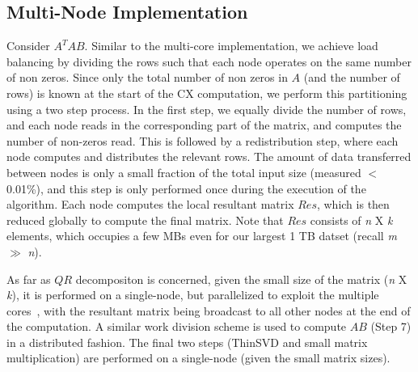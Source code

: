 \subsection {Multi-Node Implementation}
Consider $A^TAB$.
Similar to the multi-core implementation, we achieve load balancing by
dividing the rows %
such that each node operates on the same number of non zeros. 
Since only the total number of non zeros in $A$ (and the number of
rows) is known at the start
of the CX computation, we perform this partitioning using a two step
process. In the first step, we equally divide the number of rows, 
and each node reads in the corresponding
part of the matrix, and computes the number of non-zeros read. This is
followed by a redistribution step, where each node computes 
and distributes the relevant rows.
The amount of data transferred between nodes is only a small fraction of the total input size
(measured $<$ 0.01\%), and this step is only performed once during the execution of
the algorithm.
Each node computes the local resultant matrix $Res$, which is then
reduced globally to compute the final matrix. Note that $Res$ consists
of {\it{n}} X {\it{k}} elements, which occupies a few MBs even
for our largest 1 TB datset  (recall {\it{m}} $\gg$ {\it{n}}). 

As far as $QR$ decompositon is concerned, given the small size of the
matrix ({\it{n}} X {\it{k}}), it is performed on a
single-node, but parallelized to exploit the multiple cores~\cite{to_cite}, with the resultant matrix being broadcast
to all other nodes at the end of the computation.
A similar work division scheme is used to compute $AB$ (Step 7) in a
distributed fashion. The final two steps (ThinSVD and small matrix
multiplication) are performed on a single-node (given the small matrix
sizes).




